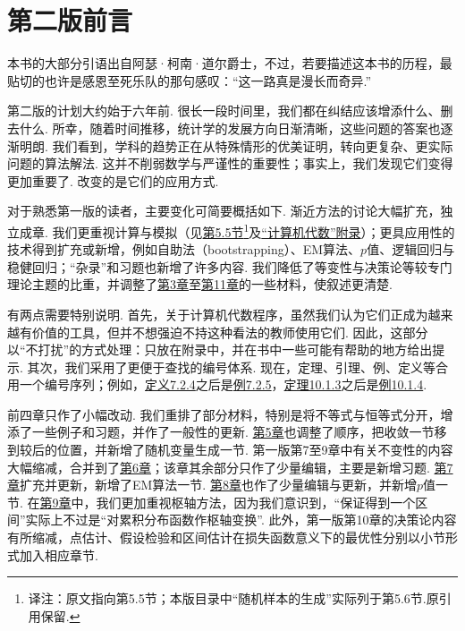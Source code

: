 \section*{第二版前言}\label{front:preface-second}
本书的大部分引语出自阿瑟·柯南·道尔爵士，不过，若要描述这本书的历程，最贴切的也许是感恩至死乐队的那句感叹：“这一路真是漫长而奇异.”

第二版的计划大约始于六年前. 很长一段时间里，我们都在纠结应该增添什么、删去什么. 所幸，随着时间推移，统计学的发展方向日渐清晰，这些问题的答案也逐渐明朗. 我们看到，学科的趋势正在从特殊情形的优美证明，转向更复杂、更实际问题的算法解法. 这并不削弱数学与严谨性的重要性；事实上，我们发现它们变得更加重要了. 改变的是它们的应用方式.

对于熟悉第一版的读者，主要变化可简要概括如下. 渐近方法的讨论大幅扩充，独立成章. 我们更重视计算与模拟（见\hyperref[sec:5.5]{第5.5节}\footnote{译注：原文指向第5.5节；本版目录中“随机样本的生成”实际列于第5.6节.原引用保留.}及\hyperref[app:computer-algebra]{“计算机代数”附录}）；更具应用性的技术得到扩充或新增，例如自助法（bootstrapping）、EM算法、$p$值、逻辑回归与稳健回归；“杂录”和习题也新增了许多内容. 我们降低了等变性与决策论等较专门理论主题的比重，并调整了\hyperref[sec:3]{第3章}至\hyperref[sec:11]{第11章}的一些材料，使叙述更清楚.

有两点需要特别说明. 首先，关于计算机代数程序，虽然我们认为它们正成为越来越有价值的工具，但并不想强迫不持这种看法的教师使用它们. 因此，这部分以“不打扰”的方式处理：只放在附录中，并在书中一些可能有帮助的地方给出提示. 其次，我们采用了更便于查找的编号体系. 现在，定理、引理、例、定义等合用一个编号序列；例如，\hyperref[def:7.2.4]{定义7.2.4}之后是\hyperref[ex:7.2.5]{例7.2.5}，\hyperref[thm:10.1.3]{定理10.1.3}之后是\hyperref[ex:10.1.4]{例10.1.4}.

前四章只作了小幅改动. 我们重排了部分材料，特别是将不等式与恒等式分开，增添了一些例子和习题，并作了一般性的更新. \hyperref[sec:5]{第5章}也调整了顺序，把收敛一节移到较后的位置，并新增了随机变量生成一节. 第一版第7至9章中有关不变性的内容大幅缩减，合并到了\hyperref[sec:6]{第6章}；该章其余部分只作了少量编辑，主要是新增习题. \hyperref[sec:7]{第7章}扩充并更新，新增了EM算法一节. \hyperref[sec:8]{第8章}也作了少量编辑与更新，并新增$p$值一节. 在\hyperref[sec:9]{第9章}中，我们更加重视枢轴方法，因为我们意识到，“保证得到一个区间”实际上不过是“对累积分布函数作枢轴变换”. 此外，第一版第10章的决策论内容有所缩减，点估计、假设检验和区间估计在损失函数意义下的最优性分别以小节形式加入相应章节.

